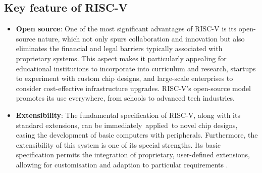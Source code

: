 \documentclass[conference]{IEEEtran}
\begin{document}
\subsection{Key feature of RISC-V}
\begin{itemize}
\item \textbf{Open source}: 
One of the most significant advantages of RISC-V is its open-source nature, which not only spurs collaboration and innovation but also eliminates the financial and legal barriers typically associated with proprietary systems. This aspect makes it particularly appealing for educational institutions to incorporate into curriculum and research, startups to experiment with custom chip designs, and large-scale enterprises to consider cost-effective infrastructure upgrades. RISC-V's open-source model promotes its use everywhere, from schools to advanced tech industries.
\item \textbf{Extensibility}:
The fundamental specification of RISC-V, along with its standard extensions, can be immediately applied to novel chip designs, easing the development of basic computers with peripherals. Furthermore, the extensibility of this system is one of its special strengths. Its basic specification permits the integration of proprietary, user-defined extensions, allowing for customisation and adaption to particular requirements \cite{15}.


\end{itemize}
\end{document}
